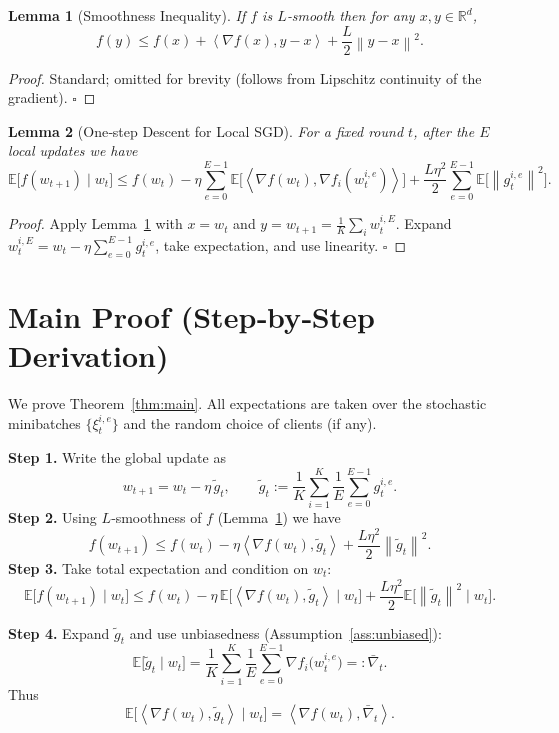 \documentclass{article}
\newtheorem{lemma}{Lemma}
\newcommand{\E}{\mathbb{E}}
\newcommand{\R}{\mathbb{R}}
\newcommand{\norm}[1]{\left\lVert#1\right\rVert}
\newcommand{\inner}[2]{\left\langle #1,#2\right\rangle}
\begin{document}
\begin{lemma}[Smoothness Inequality]\label{lem:smooth}
If $f$ is $L$‑smooth then for any $x,y\in\R^d$,
\[
f(y)\le f(x)+\inner{\nabla f(x)}{y-x}+\frac{L}{2}\norm{y-x}^2 .
\]
\end{lemma}
\begin{proof}
Standard; omitted for brevity (follows from Lipschitz continuity of the gradient). \hfill $\square$
\end{proof}

\begin{lemma}[One‑step Descent for Local SGD]\label{lem:one-step}
For a fixed round $t$, after the $E$ local updates we have
\[
\E\!\bigl[f(w_{t+1})\mid w_t\bigr]
\le f(w_t)-\eta\!\sum_{e=0}^{E-1}\E\!\bigl[\inner{\nabla f(w_t)}{\nabla f_i(w_{t}^{i,e})}\bigr]
+\frac{L\eta^2}{2}\!\sum_{e=0}^{E-1}\E\!\bigl[\norm{g_{t}^{i,e}}^2\bigr].
\]
\end{lemma}
\begin{proof}
Apply Lemma~\ref{lem:smooth} with $x=w_t$ and $y=w_{t+1}= \frac1K\sum_i w_{t}^{i,E}$.
Expand $w_{t}^{i,E}=w_t-\eta\sum_{e=0}^{E-1} g_{t}^{i,e}$, take expectation, and use linearity. \hfill $\square$
\end{proof}

\section*{Main Proof (Step‑by‑Step Derivation)}
We prove Theorem~\ref{thm:main}. All expectations are taken over the stochastic minibatches
$\{\xi_{t}^{i,e}\}$ and the random choice of clients (if any).  

\noindent\textbf{Step 1.}  Write the global update as
\[
w_{t+1}=w_t-\eta\,\tilde g_t,\qquad 
\tilde g_t:=\frac1K\sum_{i=1}^K\frac1E\sum_{e=0}^{E-1}g_{t}^{i,e}.
\tag{1}
\]
\noindent\textbf{Step 2.}  Using $L$‑smoothness of $f$ (Lemma~\ref{lem:smooth}) we have
\[
f(w_{t+1})\le f(w_t)-\eta\inner{\nabla f(w_t)}{\tilde g_t}
+\frac{L\eta^2}{2}\norm{\tilde g_t}^2 .
\tag{2}
\]
\noindent\textbf{Step 3.}  Take total expectation and condition on $w_t$:
\[
\E\!\bigl[f(w_{t+1})\mid w_t\bigr]
\le f(w_t)-\eta\,\E\!\bigl[\inner{\nabla f(w_t)}{\tilde g_t}\mid w_t\bigr]
+\frac{L\eta^2}{2}\E\!\bigl[\norm{\tilde g_t}^2\mid w_t\bigr].
\tag{3}
\]

\noindent\textbf{Step 4.}  Expand $\tilde g_t$ and use unbiasedness (Assumption~\ref{ass:unbiased}):
\[
\E\!\bigl[\tilde g_t\mid w_t\bigr]
= \frac1K\sum_{i=1}^K\frac1E\sum_{e=0}^{E-1}\nabla f_i\!\bigl(w_{t}^{i,e}\bigr)
=: \bar\nabla_t .
\tag{4}
\]
Thus
\[
\E\!\bigl[\inner{\nabla f(w_t)}{\tilde g_t}\mid w_t\bigr]
= \inner{\nabla f(w_t)}{\bar\nabla_t}.
\tag{5}
\]
\end{document}
